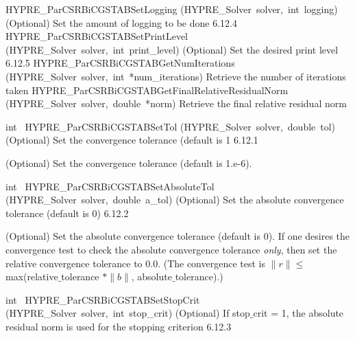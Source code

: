 \documentclass{article}
\begin{document}
\begin{cxxentry}
\begin{cxxentry}
\begin{cxxnames}
        {}
\label{cxx.6.12.13}
        {HYPRE\_ParCSRBiCGSTABSetLogging}
        {(HYPRE\_Solver\ solver,\ int\ logging)}
        {
(Optional) Set the amount of logging to be done}
        {6.12.4}
        {HYPRE\_ParCSRBiCGSTABSetPrintLevel}
        {(HYPRE\_Solver\ solver,\ int\ print\_level)}
        {
(Optional) Set the desired print level}
        {6.12.5}
        {HYPRE\_ParCSRBiCGSTABGetNumIterations}
        {(HYPRE\_Solver\ solver,\ int\ *num\_iterations)}
        {
Retrieve the number of iterations taken}
        {}
\label{cxx.6.12.14}
        {HYPRE\_ParCSRBiCGSTABGetFinalRelativeResidualNorm}
        {(HYPRE\_Solver\ solver,\ double\ *norm)}
        {
Retrieve the final relative residual norm}
        {}
\label{cxx.6.12.15}
\end{cxxnames}
\begin{cxxfunction}
{int\ }
        {HYPRE\_ParCSRBiCGSTABSetTol}
        {(HYPRE\_Solver\ solver,\ double\ tol)}
        {
(Optional) Set the convergence tolerance (default is 1}
        {6.12.1}
\begin{cxxdoc}

(Optional) Set the convergence tolerance (default is 1.e-6).
\end{cxxdoc}
\end{cxxfunction}
\begin{cxxfunction}
{int\ }
        {HYPRE\_ParCSRBiCGSTABSetAbsoluteTol}
        {(HYPRE\_Solver\ solver,\ double\ a\_tol)}
        {
(Optional) Set the absolute convergence tolerance (default is 0)}
        {6.12.2}
\begin{cxxdoc}

(Optional) Set the absolute convergence tolerance (default is 0). 
If one desires
the convergence test to check the absolute convergence tolerance {\it only}, then
set the relative convergence tolerance to 0.0.  (The convergence test is 
$\|r\| \leq$ max(relative$\_$tolerance $\ast \|b\|$, absolute$\_$tolerance).)

\end{cxxdoc}
\end{cxxfunction}
\begin{cxxfunction}
{int\ }
        {HYPRE\_ParCSRBiCGSTABSetStopCrit}
        {(HYPRE\_Solver\ solver,\ int\ stop\_crit)}
        {
(Optional) If stop$\_$crit = 1, the absolute residual norm is used
for the stopping criterion}
        {6.12.3}
\begin{cxxdoc}


\end{cxxdoc}
\end{cxxfunction}
\end{cxxentry}
\end{cxxentry}
\end{document}
